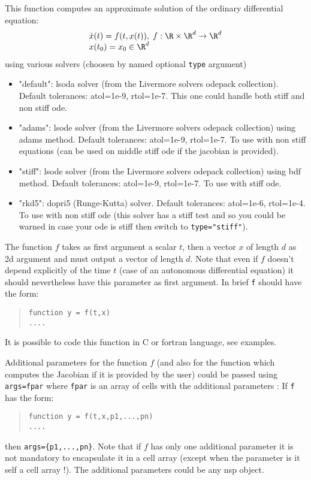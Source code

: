 \begin{mandescription}

This function computes an approximate solution of the ordinary differential equation:
$$
\begin{array}{l}
   \dot{x}(t) = f(t, x(t)), \; f: \R \times \R^d \rightarrow  \R^d \\
   x(t_0) = x_0  \in  \R^d
\end{array}
$$
using various solvers (choosen by named optional \verb+type+ argument) 
\begin{itemize}
\item "default": lsoda solver (from the Livermore solvers odepack collection). Default tolerances: atol=1e-9,
  rtol=1e-7. This one could handle both stiff and non stiff ode.
\item "adams": lsode solver (from the Livermore solvers odepack collection) using adams method. Default tolerances:
  atol=1e-9, rtol=1e-7. To use with non stiff equations (can be used on middle stiff ode if the jacobian is provided).
\item "stiff": lsode solver (from the Livermore solvers odepack collection) using bdf method. Default tolerances:
  atol=1e-9, rtol=1e-7. To use with stiff ode.
\item "rkd5": dopri5 (Runge-Kutta) solver. Default tolerances: atol=1e-6, rtol=1e-4. To use with non stiff ode (this
solver has a stiff test and so you could be warned in case your ode is stiff then switch to \verb+type="stiff"+).
\end{itemize}


The function $f$ takes as first argument a scalar $t$, then a vector $x$ of length $d$ as 2d argument and 
must output a vector of length $d$. Note that even if $f$ doesn't depend explicitly of the time $t$ (case of 
an autonomous differential equation) it should nevertheless have this parameter as first argument. 
In brief \verb+f+ should have the form:
\begin{quote}
{\tt function y = f(t,x) \\
      ....}
  \end{quote}
It is possible to code this function in C or fortran language, see examples. 

Additional parameters for the function $f$ (and also for the function which computes the Jacobian 
if it is provided by the user) could be passed using \verb+args=fpar+ where \verb+fpar+ is an array of
cells with the additional parameters :
If \verb+f+ has the form:
\begin{quote}
{\tt function y = f(t,x,p1,...,pn) \\
      ....}
\end{quote}
then \verb+args={p1,...,pn}+. Note that if $f$ has only one additional parameter 
it is not mandatory to encapsulate it in a cell array (except when the parameter is it 
self a cell array !). The additional parameters could be any nsp object. 


\end{mandescription}
